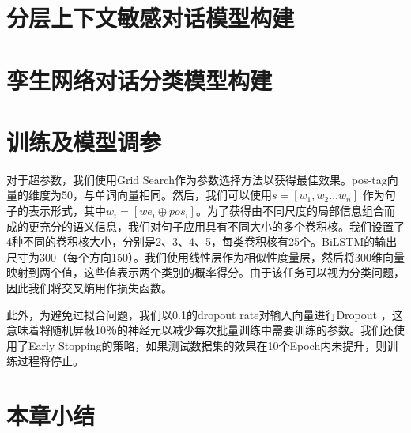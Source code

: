 \section{分层上下文敏感对话模型构建}

\section{孪生网络对话分类模型构建}

\section{训练及模型调参}

对于超参数，我们使用Grid Search\cite{Bergstra2012Random}作为参数选择方法以获得最佳效果。pos-tag向量的维度为50，与单词向量相同。然后，我们可以使用$s=[w_1,w_2\dots w_n]$ 作为句子的表示形式，其中$w_i=[we_i\oplus pos_i]$。为了获得由不同尺度的局部信息组合而成的更充分的语义信息，我们对句子应用具有不同大小的多个卷积核。我们设置了4种不同的卷积核大小，分别是2、3、4、5，每类卷积核有25个。BiLSTM的输出尺寸为300（每个方向150）。我们使用线性层作为相似性度量层，然后将300维向量映射到两个值，这些值表示两个类别的概率得分。由于该任务可以视为分类问题，因此我们将交叉熵用作损失函数。

此外，为避免过拟合问题，我们以0.1的dropout rate对输入向量进行Dropout \cite{srivastava2014dropout}，这意味着将随机屏蔽10％的神经元以减少每次批量训练中需要训练的参数。我们还使用了Early Stopping\cite{prechelt1998early}的策略，如果测试数据集的效果在10个Epoch内未提升，则训练过程将停止。
\section{本章小结}